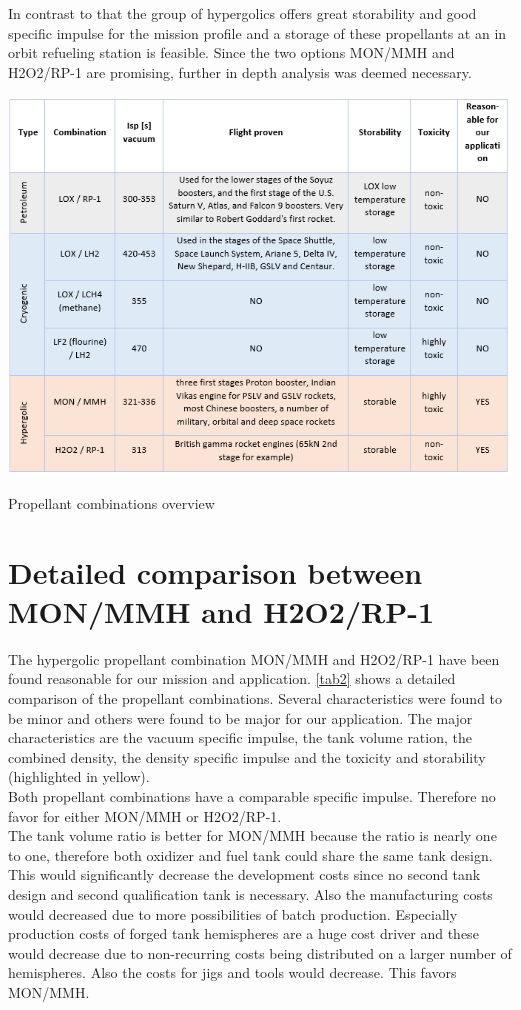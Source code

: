 In contrast to that the group of hypergolics offers great storability and good specific impulse for the mission profile and a storage of these propellants at an in orbit refueling station is feasible. Since the two options MON/MMH and H2O2/RP-1 are promising, further in depth analysis was deemed necessary. 
\begin{table}[H]

	\centering\includegraphics[width=\linewidth]{propcombination}
	
	\caption{Propellant combinations overview}\label{tab1}
\end{table}

\section{Detailed comparison between MON/MMH and H2O2/RP-1}
\qquad The hypergolic propellant combination MON/MMH and H2O2/RP-1 have been found reasonable for our mission and application. \autoref{tab2} shows a detailed comparison of the propellant combinations. Several characteristics were found to be minor and others were found to be major for our application. The major characteristics are the vacuum specific impulse, the tank volume ration, the combined density, the density specific impulse and the toxicity and storability (highlighted in yellow). \\

Both propellant combinations have a comparable specific impulse. Therefore no favor for either MON/MMH or H2O2/RP-1.\\

The tank volume ratio is better for MON/MMH because the ratio is nearly one to one, therefore both oxidizer and fuel tank could share the same tank design. This would significantly decrease the development costs since no second tank design and second qualification tank is necessary. Also the manufacturing costs would decreased due to more possibilities of batch production. Especially production costs of forged tank hemispheres are a huge cost driver and these would decrease due to non-recurring costs being distributed on a larger number of hemispheres.  Also the costs for jigs and tools would decrease. This favors MON/MMH.\\

